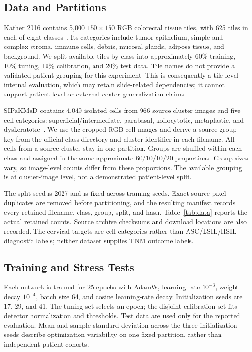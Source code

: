 \documentclass{svproc}
\begin{document}
\subsection{Data and Partitions}

Kather 2016 contains 5,000 $150\times150$ RGB colorectal tissue tiles, with 625 tiles in each of eight classes~\cite{kather2016,katherdata2016}. Its categories include tumor epithelium, simple and complex stroma, immune cells, debris, mucosal glands, adipose tissue, and background. We split available tiles by class into approximately 60\% training, 10\% tuning, 10\% calibration, and 20\% test data. Tile names do not provide a validated patient grouping for this experiment. This is consequently a tile-level internal evaluation, which may retain slide-related dependencies; it cannot support patient-level or external-center generalization claims.

SIPaKMeD contains 4,049 isolated cells from 966 source cluster images and five cell categories: superficial/intermediate, parabasal, koilocytotic, metaplastic, and dyskeratotic~\cite{plissiti2018}. We use the cropped RGB cell images and derive a source-group key from the official class directory and cluster identifier in each filename. All cells from a source cluster stay in one partition. Groups are shuffled within each class and assigned in the same approximate 60/10/10/20 proportions. Group sizes vary, so image-level counts differ from these proportions. The available grouping is at cluster-image level, not a demonstrated patient-level split.

The split seed is 2027 and is fixed across training seeds. Exact source-pixel duplicates are removed before partitioning, and the resulting manifest records every retained filename, class, group, split, and hash. Table~\ref{tab:data} reports the actual retained counts. Source archive checksums and download locations are also recorded. The cervical targets are cell categories rather than ASC/LSIL/HSIL diagnostic labels; neither dataset supplies TNM outcome labels.

\subsection{Training and Stress Tests}
Each network is trained for 25 epochs with AdamW, learning rate $10^{-3}$, weight decay $10^{-4}$, batch size 64, and cosine learning-rate decay. Initialization seeds are 17, 29, and 41. The tuning set selects an epoch; the disjoint calibration set fits detector normalization and thresholds. Test data are used only for the reported evaluation. Mean and sample standard deviation across the three initialization seeds describe optimization variability on one fixed partition, rather than independent patient cohorts.
\end{document}

